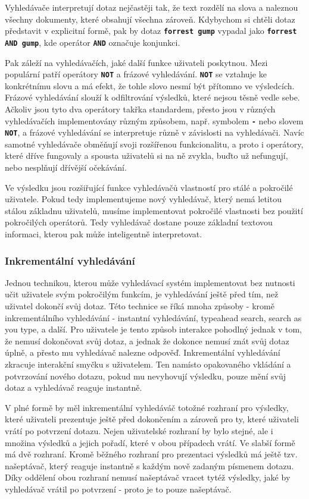 \documentclass[11pt,letterpaper,oneside,openright]{book}
\newcommand{\bftt}[1]{\texttt{\textbf{#1}}}
\begin{document}
Vyhledávače interpretují dotaz nejčastěji tak, že text rozdělí na slova a
naleznou všechny dokumenty, které obsahují všechna zároveň. Kdybychom si chtěli
dotaz představit v explicitní formě, pak by dotaz \bftt{forrest gump} vypadal
jako \bftt{forrest AND gump}, kde operátor \bftt{AND} označuje konjunkci.

Pak záleží na vyhledávačích, jaké další funkce uživateli poskytnou. Mezi
populární patří operátory \bftt{NOT} a frázové vyhledávání. \bftt{NOT} se
vztahuje ke konkrétnímu slovu a má efekt, že tohle slovo nesmí být přítomno ve
výsledcích. Frázové vyhledávání slouží k odfiltrování výsledků, které nejsou
těsně vedle sebe. Ačkoliv jsou tyto dva operátory takřka standardem, přesto
jsou v různých vyhledávačích implementovány různým způsobem, např. symbolem
\bftt{-} nebo slovem \bftt{NOT}, a frázové vyhledávání se interpretuje různě v
závislosti na vyhledávači. Navíc samotné vyhledávače obměňují svoji rozšířenou
funkcionalitu, a proto i operátory, které dříve fungovaly a spousta uživatelů
si na ně zvykla, buďto už nefungují, nebo nesplňují dřívější očekávání.

Ve výsledku jsou rozšiřující funkce vyhledávačů vlastností pro stálé a
pokročilé uživatele. Pokud tedy implementujeme nový vyhledávač, který nemá
letitou stálou základnu uživatelů, musíme implementovat pokročilé vlastnosti
bez použití pokročilých operátorů. Tedy vyhledávač dostane pouze základní
textovou informaci, kterou pak může inteligentně interpretovat.

\subsubsection{Inkrementální vyhledávání}
Jednou technikou, kterou může vyhledávací systém implementovat bez nutnosti
učit uživatele svým pokročilým funkcím, je vyhledávání ještě před tím, než
uživatel dokončí svůj dotaz. Této technice se říká mnoha způsoby - kromě
inkrementálního vyhledávání - instantní vyhledávání, typeahead search, search
as you type, a další. Pro uživatele je tento způsob interakce pohodlný jednak v
tom, že nemusí dokončovat svůj dotaz, a jednak že dokonce nemusí znát svůj
dotaz úplně, a přesto mu vyhledávač nalezne odpověď. Inkrementální vyhledávání
zkracuje interakční smyčku s uživatelem. Ten namísto opakovaného vkládání a
potvrzování nového dotazu, pokud mu nevyhovují výsledku, pouze mění svůj dotaz
a vyhledávač reaguje instantně.

V plné formě by měl inkrementální vyhledáváč totožné rozhraní pro výsledky,
které uživateli prezentuje ještě před dokončením a zároveň pro ty, které
uživateli vrátí po potvrzení dotazu. Nejen uživatelské rozhraní by bylo stejné,
ale i množina výsledků a jejich pořadí, které v obou případech vrátí. Ve slabší
formě má dvě rozhraní. Kromě běžného rozhraní pro prezentaci výsledků má ještě
tzv. našeptávač, který reaguje instantně s každým nově zadaným písmenem dotazu.
Díky oddělení obou rozhraní nemusí našeptávač vracet tytéž výsledky, jaké by
vyhledávač vrátil po potvrzení - proto je to pouze našeptávač.
\end{document}
